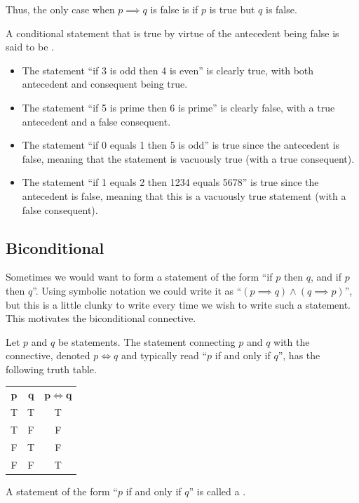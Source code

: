 Thus, the only case when $p \implies q$ is false is if $p$ is true but $q$ is false.

\begin{remark}
    A conditional statement that is true by virtue of the antecedent being false is said to be .
\end{remark}

\begin{example}
    \begin{itemize}[leftmargin=*]
        \item The statement ``if 3 is odd then 4 is even'' is clearly true, with both antecedent and consequent being true.
        \item The statement ``if 5 is prime then 6 is prime'' is clearly false, with a true antecedent and a false consequent.
        \item The statement ``if 0 equals 1 then 5 is odd'' is true since the antecedent is false, meaning that the statement is vacuously true (with a true consequent).
        \item The statement ``if 1 equals 2 then 1234 equals 5678'' is true since the antecedent is false, meaning that this is a vacuously true statement (with a false consequent).
    \end{itemize}    
\end{example}

\subsection{Biconditional}
Sometimes we would want to form a statement of the form ``if $p$ then $q$, and if $p$ then $q$''. Using symbolic notation we could write it as ``$(p \implies q) \land (q \implies p)$'', but this is a little clunky to write every time we wish to write such a statement. This motivates the biconditional connective.

\begin{definition}[Biconditional]
    Let $p$ and $q$ be statements. The statement connecting $p$ and $q$ with the  connective, denoted $p \iff q$ and typically read ``$p$ if and only if $q$'', has the following truth table.
    \begin{table}[H]
        \centering
        \begin{tabular}{|c|c||c|}
            \hline
            $\boldsymbol{p}$ & $\boldsymbol{q}$ & $\boldsymbol{p \iff q}$ \\ \hhline{|=|=#=|}
            T & T & T \\ \hline
            T & F & F \\ \hline
            F & T & F \\ \hline
            F & F & T \\ \hline
        \end{tabular}
    \end{table}
    A statement of the form ``$p$ if and only if $q$'' is called a .
\end{definition}

